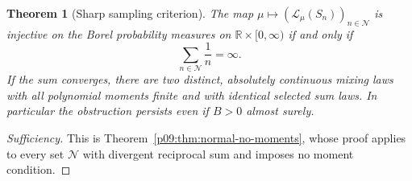 \documentclass[11pt,letterpaper]{article}
\newtheorem{theorem}{Theorem}[section]
\theoremstyle{definition}
\theoremstyle{remark}
\newcommand{\1}{\mathbf 1}
\begin{document}
\begin{theorem}[Sharp sampling criterion]
\label{p09:thm:sharp-gaussian}
The map $\mu\mapsto(\mathcal L_\mu(S_n))_{n\in\mathcal N}$ is injective
on the Borel probability measures on
$\mathbb R\times[0,\infty)$ if and only if
\[
   \sum_{n\in\mathcal N}\frac1n=\infty.
\]
If the sum converges, there are two distinct, absolutely continuous
mixing laws with all polynomial moments finite and with identical
selected sum laws.  In particular the obstruction persists even if
$B>0$ almost surely.
\end{theorem}

\begin{proof}[Sufficiency]
This is Theorem~\ref{p09:thm:normal-no-moments}, whose proof applies to
every set $\mathcal N$ with divergent reciprocal sum and imposes no
moment condition.
\end{proof}
\end{document}
